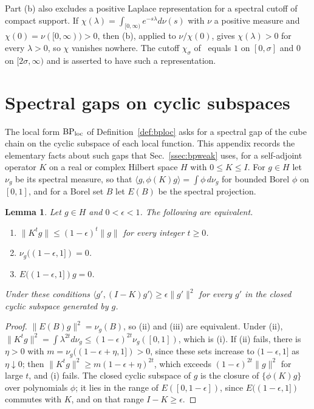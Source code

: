 \documentclass[aps,prd,twocolumn,superscriptaddress,nofootinbib,longbibliography,floatfix,amsmath,amssymb,10pt]{revtex4-2}
\newtheorem{lemma}[theorem]{Lemma}
\theoremstyle{definition}
\theoremstyle{remark}
\newcommand{\ip}[2]{\langle #1,#2\rangle}
\begin{document}
Part (b) also excludes a positive Laplace representation for a spectral
cutoff of compact support. If $\chi(\lambda)=\int_{[0,\infty)}e^{-s\lambda}
d\nu(s)$ with $\nu$ a positive measure and $\chi(0)=\nu([0,\infty))>0$, then
(b), applied to $\nu/\chi(0)$, gives $\chi(\lambda)>0$ for every $\lambda>0$, so
$\chi$ vanishes nowhere. The cutoff $\chi_\sigma$ of~\cite[Sec.~9,
Eqs.~(9.11), (9.12)]{FaS26} equals $1$ on $[0,\sigma]$ and $0$ on
$[2\sigma,\infty)$ and is asserted to have such a representation.

\section{Spectral gaps on cyclic subspaces}\label{app:cyclic}

The local form $\mathrm{BP}_{\rm loc}$ of Definition~\ref{def:bploc} asks
for a spectral gap of the cube chain on the cyclic subspace of each local
function. This appendix records the elementary facts about such gaps that
Sec.~\ref{ssec:bpweak} uses, for a self-adjoint operator $K$ on a real or
complex Hilbert space $H$ with $0\le K\le I$. For $g\in H$ let $\nu_g$ be
its spectral measure, so that $\ip g{\phi(K)g}=\int\phi\,d\nu_g$ for
bounded Borel $\phi$ on $[0,1]$, and for a Borel set $B$ let $E(B)$ be the
spectral projection.

\begin{lemma}\label{lem:cyclicgap}
Let $g\in H$ and $0<\epsilon<1$. The following are equivalent.
\begin{enumerate}[label=\textup{(\roman*)},leftmargin=*]
\item $\lVert K^tg\rVert\le(1-\epsilon)^t\lVert g\rVert$ for every integer
$t\ge0$.
\item $\nu_g((1-\epsilon,1])=0$.
\item $E((1-\epsilon,1])g=0$.
\end{enumerate}
Under these conditions $\ip{g'}{(I-K)g'}\ge\epsilon\lVert g'\rVert^2$ for
every $g'$ in the closed cyclic subspace generated by $g$.
\end{lemma}

\begin{proof}
$\lVert E(B)g\rVert^2=\nu_g(B)$, so (ii) and (iii) are equivalent. Under
(ii), $\lVert K^tg\rVert^2=\int\lambda^{2t}d\nu_g\le(1-\epsilon)^{2t}\nu_g(
[0,1])$, which is (i). If (ii) fails, there is $\eta>0$ with $m=\nu_g((1-
\epsilon+\eta,1])>0$, since these sets increase to $(1-\epsilon,1]$ as
$\eta\downarrow0$; then $\lVert K^tg\rVert^2\ge m(1-\epsilon+\eta)^{2t}$,
which exceeds $(1-\epsilon)^{2t}\lVert g\rVert^2$ for large $t$, and (i)
fails. The closed cyclic subspace of $g$ is the closure of $\{\phi(K)g\}$
over polynomials $\phi$; it lies in the range of $E([0,1-\epsilon])$,
since $E((1-\epsilon,1])$ commutes with $K$, and on that range $I-K\ge
\epsilon$.
\end{proof}
\end{document}
